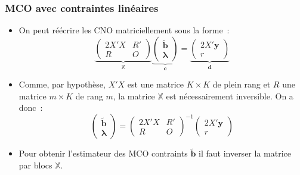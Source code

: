 \documentclass[10pt]{beamer}
\begin{document}
\begin{frame}
  \frametitle{MCO avec contraintes linéaires}

  \begin{itemize}

  \item On peut réécrire les CNO matriciellement sous la forme~:
    \[
      \underbrace{
      \begin{pmatrix}
        2X'X & R'\\
        R & O
      \end{pmatrix}}_{\mathbb X}
    \underbrace{
      \begin{pmatrix}
        \tilde{\mathbf b}\\
        \bm{\lambda}
      \end{pmatrix}}_{\mathbf c}
    =
    \underbrace{
      \begin{pmatrix}
        2X'\mathbf y\\
        r
      \end{pmatrix}}_{\mathbf d}
    \]

    \medskip

  \item Comme, par hypothèse, $X'X$ est une matrice $K\times K$ de plein rang et $R$ une matrice $m\times K$ de rang $m$, la matrice $\mathbb X$ est nécessairement inversible. On a donc~:
    \[
      \begin{pmatrix}
        \tilde{\mathbf b}\\
        \bm{\lambda}
      \end{pmatrix} =
      \begin{pmatrix}
        2X'X & R'\\
        R & O
      \end{pmatrix}^{-1}
      \begin{pmatrix}
        2X'\mathbf y\\
        r
      \end{pmatrix}
    \]

    \medskip

  \item Pour obtenir l'estimateur des MCO contraints $\tilde{\mathbf b}$ il faut inverser la matrice par blocs $\mathbb X$.

  \end{itemize}

\end{frame}
\end{document}
